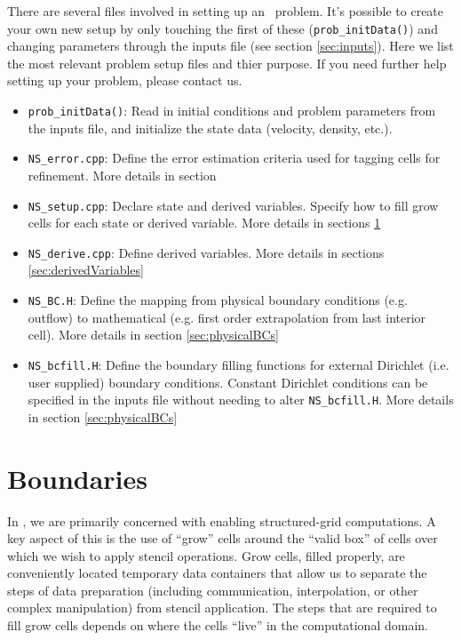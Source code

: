 There are several files involved in setting up an \iamr\ problem. It's possible to
create your own new setup by only touching the first of these ({\tt prob\_initData()})
and changing parameters through the inputs file (see section \ref{sec:inputs}).
Here we list the most relevant problem
setup files and thier purpose. If you need further help setting up your problem, please
contact us.
\begin{itemize}

\item {\tt prob\_initData()}:
  Read in initial conditions and problem parameters from the inputs file,
  and initialize the state data (velocity, density, etc.).

\item {\tt NS\_error.cpp}: Define the error estimation criteria used for tagging cells for
  refinement.
  More details in section \label{sec:tagging}

\item {\tt NS\_setup.cpp}: Declare state and derived variables.
  Specify how to fill grow cells for each state or derived variable.
  More details in sections \ref{sec:boundaries}

\item {\tt NS\_derive.cpp}: Define derived variables. 
  More details in sections \ref{sec:derivedVariables}  

\item {\tt NS\_BC.H}: Define the mapping from physical boundary conditions (e.g. outflow)
  to mathematical (e.g. first order extrapolation from last interior cell).
  More details in section \ref{sec:physicalBCs}

\item {\tt NS\_bcfill.H}:
  Define the boundary filling functions for external Dirichlet (i.e. user supplied)
  boundary conditions. Constant Dirichlet conditions can be specified in the
  inputs file without needing to alter  {\tt NS\_bcfill.H}.
  More details in section \ref{sec:physicalBCs}
  
\end{itemize}


\section{Boundaries}
\label{sec:boundaries}
In \amrex, we are primarily concerned with enabling structured-grid
computations.  A key aspect of this is the use of ``grow'' cells
around the ``valid box'' of cells over which we wish to apply stencil operations.
Grow cells, filled properly, are conveniently located temporary 
data containers that allow us to separate the steps of data preparation
(including communication, interpolation, or other complex manipulation)
from stencil application.  The steps that are required to fill grow cells
depends on where the cells ``live'' in the computational domain.


